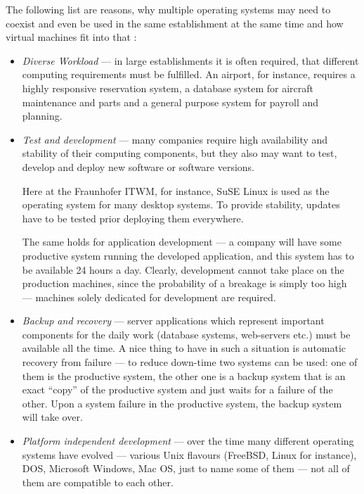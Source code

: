 \bigskip

The following list are reasons, why multiple operating systems may need to
coexist and  even be used in the  same establishment at the  same time and
how virtual machines fit into that \cite{borden89,virtualization-overview}:

\begin{itemize}
\item  \emph{Diverse Workload}  --- in  large establishments  it  is often
  required, that  different computing  requirements must be  fulfilled. An
  airport, for instance, requires  a highly responsive reservation system,
  a  database system  for aircraft  maintenance  and parts  and a  general
  purpose system for payroll and planning.
\item  \emph{Test  and  development}   ---  many  companies  require  high
  availability and stability of  their computing components, but they also
  may want to test, develop  and deploy new software or software versions.
  
  Here at  the Fraunhofer ITWM,  for instance, SuSE  Linux is used  as the
  operating system for many desktop systems. To provide stability, updates
  have to be tested prior deploying them everywhere.

  The same holds for application  development --- a company will have some
  productive system running the developed application, and this system has
  to be available  24 hours a day. Clearly,  development cannot take place
  on  the production  machines, since  the  probability of  a breakage  is
  simply  too  high ---  machines  solely  dedicated  for development  are
  required.
\item \emph{Backup  and recovery} --- server  applications which represent
  important  components   for  the  daily   work  (\eg database  systems,
  web-servers etc.) must  be available all the time. A  nice thing to have
  in such  a situation  is automatic recovery  from failure ---  to reduce
  down-time two systems can be used: one of them is the productive system,
  the  other one  is a  backup system  that is  an exact  ``copy''  of the
  productive system  and just waits  for a failure  of the other.   Upon a
  system failure  in the  productive system, the  backup system  will take
  over.
\item  \emph{Platform  independent development}  ---  over  the time  many
  different  operating  systems have  evolved  ---  various Unix  flavours
  (FreeBSD, Linux for  instance), DOS, Microsoft Windows, Mac  OS, just to
  name some of them --- not all of them are compatible to each other.


\end{itemize}
